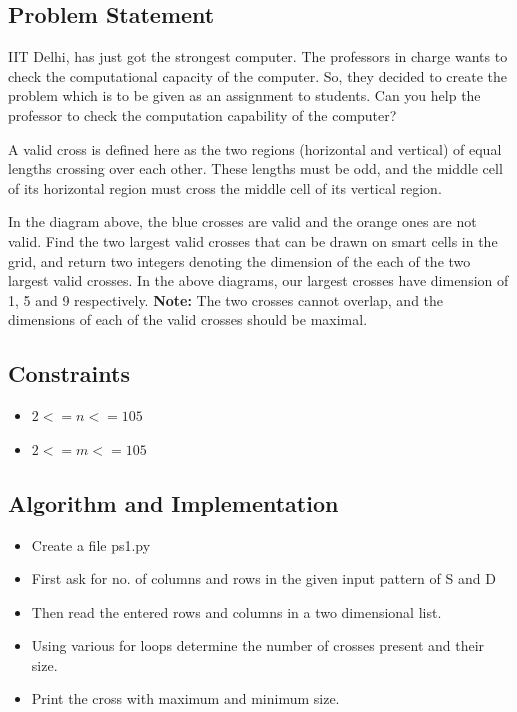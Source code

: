\documentclass[12pt]{article}
\begin{document}
	
		\subsection{Problem Statement}
		IIT Delhi, has just got the strongest computer. The professors in charge wants to check the
		computational capacity of the computer. So, they decided to create the problem which is to
		be given as an assignment to students. Can you help the professor to check the computation
		capability of the computer?
		
		A valid cross is defined here as the two regions (horizontal and vertical) of equal lengths
		crossing over each other. These lengths must be odd, and the middle cell of its horizontal
		region must cross the middle cell of its vertical region.
		
		In the diagram above, the blue crosses are valid and the orange ones are not valid.
		Find the two largest valid crosses that can be drawn on smart cells in the grid, and return
		two integers denoting the dimension of the each of the two largest valid crosses. In the
		above diagrams, our largest crosses have dimension of 1, 5 and 9 respectively.
		\textbf{Note:} The two crosses cannot overlap, and the dimensions of each of the valid crosses
		should be maximal.
		
			
		\subsection{Constraints}
		
			\begin{itemize}
				\item $2<=n<=105$
				\item $2<=m<=105$
			\end{itemize}
		
		\subsection{Algorithm and Implementation~\cite{}}
		
			\begin{itemize}
				\item Create a file ps1.py
				\item First ask for no. of columns and rows in the given input pattern of S and D
			    \item Then read the entered rows and columns in a two dimensional list.
			    \item Using various for loops determine the number of crosses present and their size.
			    \item Print the cross with maximum and minimum size.
			\end{itemize}
		
\end{document}
